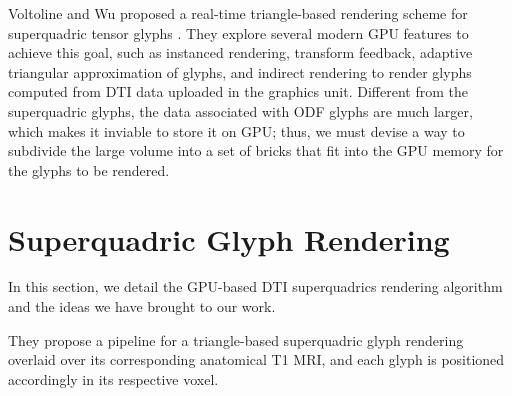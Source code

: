 \documentclass[twoside,twocolumn,10pt]{article}
\begin{document}
Voltoline and Wu \cite{voltoline2021} proposed a real-time triangle-based rendering scheme for superquadric tensor glyphs \cite{Kindlmann2004}. They explore several modern GPU features to achieve this goal, such as instanced rendering, transform feedback, adaptive triangular approximation of glyphs, and indirect rendering to render glyphs computed from DTI data uploaded in the graphics unit. Different from the superquadric glyphs, the data associated with ODF glyphs are much larger, which makes it inviable to store it on GPU; thus, we must devise a way to subdivide the large volume into a set of bricks that fit into the GPU memory for the glyphs to be rendered.






\section{Superquadric Glyph Rendering}


In this section, we detail the GPU-based DTI superquadrics rendering algorithm  and the ideas we have brought to our work.

They propose a pipeline for a triangle-based superquadric glyph rendering overlaid over its corresponding anatomical T1 MRI, and each glyph is positioned accordingly in its respective voxel.

\end{document}
